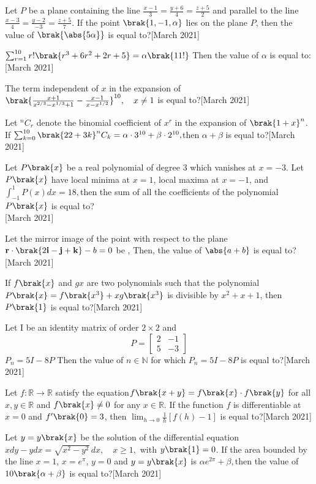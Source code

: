      \item Let $ P $ be a plane containing the line 
$\frac{x - 1}{3} = \frac{y + 6}{4} = \frac{z + 5}{2}$
and parallel to the line $\frac{x - 3}{4} = \frac{y - 2}{-3} = \frac{z + 5}{7}.$ If the point $\brak{1, -1, \alpha}$ lies on the plane $P$, then the value of $\brak{\abs{5\alpha}}$ is equal to?\hfill{[March 2021]}
     \item $ \sum_{r=1}^{10} r! \brak{r^3 + 6r^2 + 2r + 5} = \alpha\brak{11!}$
Then the value of $\alpha$ is equal to:\hfill [March 2021]
     \item The term independent of $x$ in the expansion of$\brak{\frac{x + 1}{x^{2/3} - x^{1/3} + 1} - \frac{x - 1}{x - x^{1/2}}}^{10}, \quad x \neq 1$ is equal to?\hfill [March 2021]
     \item  Let $^nC_r$ denote the binomial coefficient of $x^r$ in the expansion of $\brak{1 + x}^n$. If $\sum_{k=0}^{10} \brak{22 + 3k}   ^nC_k = \alpha \cdot 3^{10} + \beta \cdot 2^{10},$then $\alpha + \beta$ is equal to?\hfill [March 2021]
      \item Let $P\brak{x}$ be a real polynomial of degree 3 which vanishes at $x = -3$. Let $P\brak{x}$ have local minima at $x = 1$, local maxima at $x = -1$, and $\int_{-1}^{1} P(x) dx = 18,$then the sum of all the coefficients of the polynomial $P\brak{x}$ is equal to?\\\hfill [March 2021]
     \item Let the mirror image of the point  with respect to the plane $\mathbf{r} \cdot \brak{2\mathbf{i} - \mathbf{j} + \mathbf{k}} - b = 0$ be , Then, the value of $\abs{a + b}$ is equal to?\hfill [March 2021]
     \item If $f\brak{x}$ and $g{x}$ are two polynomials such that the polynomial $P\brak{x} = f\brak{x^3} + x g\brak{x^3}$ is divisible by $x^2 + x + 1$, then $P\brak{1}$ is equal to?\hfill [March 2021]
     \item Let I be an identity matrix of order $2 \times 2$ and 
$$P=\begin{bmatrix}
    2 & -1\\
    5 & -3
 \end{bmatrix}$$ 
$P_n = 5I - 8P$ Then the value of $n \in \mathbb{N}$ for which $P_n = 5I - 8P$ is equal to?\hfill [March 2021]
    \item Let $f : \mathbb{R} \to \mathbb{R}$ satisfy the equation$f\brak{x + y} = f\brak{x} \cdot f\brak{y}$ for all $x, y \in \mathbb{R}$ and $f\brak{x} \neq 0$ for any $x \in \mathbb{R}$. If the function $f$ is differentiable at $x = 0$ and $f'\brak{0} = 3$, then $\lim_{h \to 0} \frac{1}{h} [f(h) - 1] $
is equal to?\hfill [March 2021]
    \item Let $y = y\brak{x}$ be the solution of the differential equation 
$x dy - y dx = \sqrt{x^2 - y^2} \, dx, \quad x \geq 1,$ with $y\brak{1} = 0$. If the area bounded by the line $x = 1$, $x = e^\pi$, $y = 0$ and $y = y\brak{x}$ is $\alpha e^{2\pi} + \beta, $then the value of $10 \brak{\alpha + \beta}$ is equal to?\hfill [March 2021]

